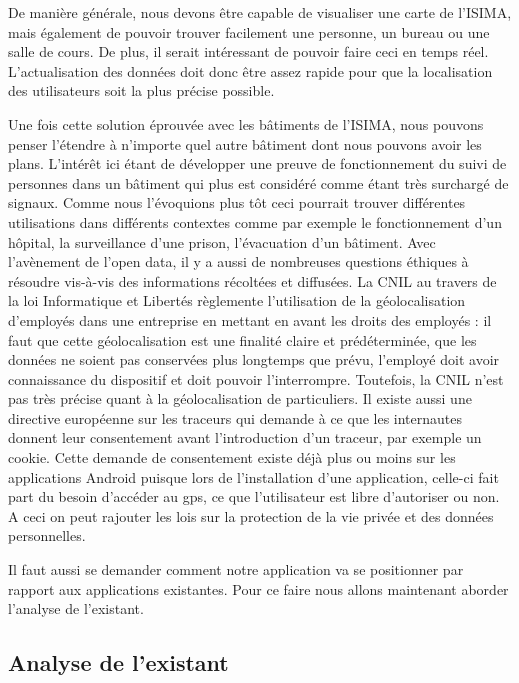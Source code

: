 De manière générale, nous devons être capable de visualiser une carte de l'ISIMA, mais également de pouvoir trouver facilement une personne, un bureau ou une salle de cours. De plus, il serait intéressant de pouvoir faire ceci en temps réel. L'actualisation des données doit donc être assez rapide pour que la localisation des utilisateurs soit la plus précise possible.

Une fois cette solution éprouvée avec les bâtiments de l'ISIMA, nous pouvons penser l'étendre à n'importe quel autre bâtiment dont nous pouvons avoir les plans. L’intérêt ici étant de développer une preuve de fonctionnement du suivi de personnes dans un bâtiment qui plus est considéré comme étant très surchargé de signaux. Comme nous l’évoquions plus tôt ceci pourrait trouver différentes utilisations dans différents contextes comme par exemple le fonctionnement d’un hôpital, la surveillance d’une prison, l’évacuation d’un bâtiment. Avec l’avènement de l’open data, il y a aussi de nombreuses questions éthiques à résoudre vis-à-vis des informations récoltées et diffusées. La CNIL au travers de la loi Informatique et Libertés règlemente l'utilisation de la géolocalisation d'employés dans une entreprise \cite{loigeo} en mettant en avant les droits des employés : il faut que cette géolocalisation est une finalité claire et prédéterminée, que les données ne soient pas conservées plus longtemps que prévu, l'employé doit avoir connaissance du dispositif et doit pouvoir l'interrompre. Toutefois, la CNIL n'est pas très précise quant à la géolocalisation de particuliers. Il existe aussi une directive européenne sur les traceurs \cite{cookies} qui demande à ce que les internautes donnent leur consentement avant l'introduction d'un traceur, par exemple un cookie. Cette demande de consentement existe déjà plus ou moins sur les applications Android puisque lors de l'installation d'une application, celle-ci fait part du besoin d'accéder au gps, ce que l'utilisateur est libre d'autoriser ou non. A ceci on peut rajouter les lois sur la protection de la vie privée et des données personnelles.

Il faut aussi se demander comment notre application va se positionner par rapport aux applications existantes. Pour ce faire nous allons maintenant aborder l’analyse de l’existant.


\subsection{Analyse de l'existant}

